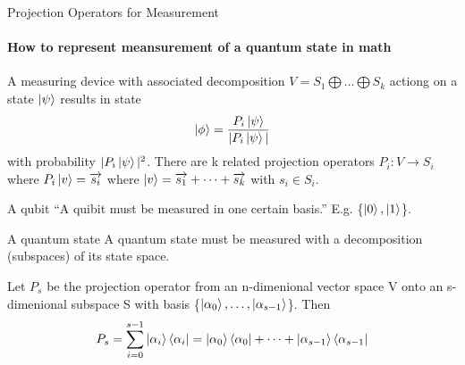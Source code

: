 \documentclass{beamer}
\begin{document}
\begin{frame}{Projection Operators for Measurement}
  \framesubtitle{How to represent meansurement of a quantum state in math}
  {\tiny
    A measuring device with associated decomposition $V=S_1 \bigoplus \dots \bigoplus S_k$ actiong on a state $\ket{\psi}$ results in state
    \begin{align*}
      \ket{\phi} = \frac {P_i\ket{\psi}} {|P_i\ket{\psi}|}
    \end{align*}
    with probability $|P_i\ket{\psi}|^2$.
    There are k related projection operators $P_i: V \rightarrow S_i$ where $P_i\ket{v}=\overrightarrow{s_i}$ where $\ket{v} = \overrightarrow{s_1} + \dots + \overrightarrow{s_k}$ with $s_i \in S_i$.
  \begin{block}{A qubit}
    “A quibit must be measured in one certain basis.” E.g. \{$\ket0, \ket1$\}.
  \end{block}
  \begin{block}{A quantum state}
    A quantum state must be measured with a decomposition (subspaces) of its state space.
  \end{block}
  Let $P_s$ be the projection operator from an n-dimenional vector space V onto an s-dimenional subspace S with basis \{$\ket{\alpha_0}, \dots, \ket{\alpha_{s-1}}$\}. Then
  \begin{align*}
    P_s = \sum^{s-1}_{i=0} \ket{\alpha_i} \bra{\alpha_i} = \ket{\alpha_0}\bra{\alpha_0} + \dots + \ket{\alpha_{s-1}}\bra{\alpha_{s-1}}
  \end{align*}
  }%
\end{frame}
\end{document}
